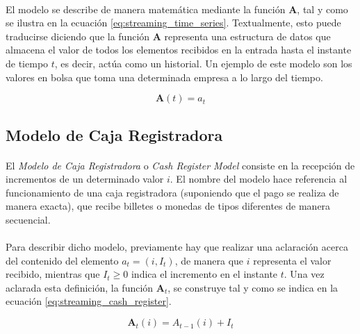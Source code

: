 \documentclass{subfiles}
\begin{document}
        \paragraph{}
        El modelo se describe de manera matemática mediante la función $\boldsymbol{A}$, tal y como se ilustra en la ecuación \eqref{eq:streaming_time_series}. Textualmente, esto puede traducirse diciendo que la función $\boldsymbol{A}$ representa una estructura de datos que almacena el valor de todos los elementos recibidos en la entrada hasta el instante de tiempo $t$, es decir, actúa como un historial. Un ejemplo de este modelo son los valores en bolsa que toma una determinada empresa a lo largo del tiempo.

        \begin{equation}
  			\label{eq:streaming_time_series}
  				\boldsymbol{A}(t) = a_t
  			\end{equation}

      \subsection{Modelo de Caja Registradora}
      \label{sec:streaming_cash_register}

        \paragraph{}
        El \emph{Modelo de Caja Registradora} o \emph{Cash Register Model} consiste en la recepción de incrementos de un determinado valor $i$. El nombre del modelo hace referencia al funcionamiento de una caja registradora (suponiendo que el pago se realiza de manera exacta), que recibe billetes o monedas de tipos diferentes de manera secuencial.

        \paragraph{}
        Para describir dicho modelo, previamente hay que realizar una aclaración acerca del contenido del elemento $a_t = (i, I_t)$, de manera que $i$ representa el valor recibido, mientras que $I_t \geq 0$ indica el incremento en el instante $t$. Una vez aclarada esta definición, la función $\boldsymbol{A}_{t}$, se construye tal y como se indica en la ecuación \eqref{eq:streaming_cash_register}.

        \begin{equation}
  			\label{eq:streaming_cash_register}
  				\boldsymbol{A}_{t}(i) = {A}_{t-1}(i) + I_{t}
  			\end{equation}
\end{document}
